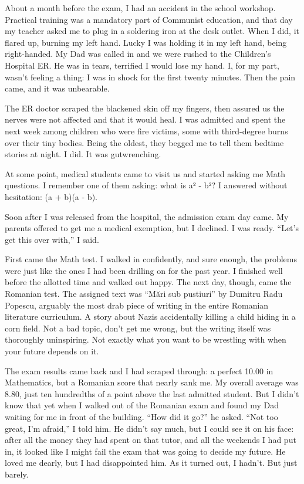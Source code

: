 \documentclass[12pt]{book}
\begin{document}
About a month before the exam, I had an accident in the school workshop.
Practical training was a mandatory part of Communist education, and that
day my teacher asked me to plug in a soldering iron at the desk outlet.
When I did, it flared up, burning my left hand. Lucky I was holding it
in my left hand, being right-handed. My Dad was called in and we were
rushed to the Children's Hospital ER. He was in tears, terrified I would
lose my hand. I, for my part, wasn't feeling a thing: I was in shock for
the first twenty minutes. Then the pain came, and it was unbearable.

The ER doctor scraped the blackened skin off my fingers, then assured us
the nerves were not affected and that it would heal. I was admitted and
spent the next week among children who were fire victims, some with
third-degree burns over their tiny bodies. Being the oldest, they begged
me to tell them bedtime stories at night. I did. It was gutwrenching.

At some point, medical students came to visit us and started asking me
Math questions. I remember one of them asking: what is a² - b²? I
answered without hesitation: (a + b)(a - b).

Soon after I was released from the hospital, the admission exam day
came. My parents offered to get me a medical exemption, but I declined.
I was ready. ``Let's get this over with,'' I said.

First came the Math test. I walked in confidently, and sure enough, the
problems were just like the ones I had been drilling on for the past
year. I finished well before the allotted time and walked out happy. The
next day, though, came the Romanian test. The assigned text was ``Mări
sub pustiuri'' by Dumitru Radu Popescu, arguably the most drab piece of
writing in the entire Romanian literature curriculum. A story about
Nazis accidentally killing a child hiding in a corn field. Not a bad
topic, don't get me wrong, but the writing itself was thoroughly
uninspiring. Not exactly what you want to be wrestling with when your
future depends on it.

The exam results came back and I had scraped through: a perfect 10.00 in
Mathematics, but a Romanian score that nearly sank me. My overall
average was 8.80, just ten hundredths of a point above the last admitted
student. But I didn't know that yet when I walked out of the Romanian
exam and found my Dad waiting for me in front of the building. ``How did
it go?'' he asked. ``Not too great, I'm afraid,'' I told him. He didn't
say much, but I could see it on his face: after all the money they had
spent on that tutor, and all the weekends I had put in, it looked like I
might fail the exam that was going to decide my future. He loved me
dearly, but I had disappointed him. As it turned out, I hadn't. But just
barely.
\end{document}
